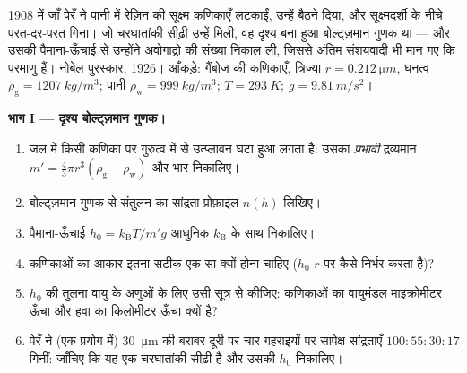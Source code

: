 \begin{problem}\label{pb:b3:canonical-ensemble:1}
1908 में जाँ पेरँ ने पानी में रेज़िन की सूक्ष्म कणिकाएँ लटकाईं,
उन्हें बैठने दिया, और सूक्ष्मदर्शी के नीचे परत-दर-परत गिना। जो
चरघातांकी सीढ़ी उन्हें मिली, वह दृश्य बना हुआ बोल्ट्ज़मान गुणक था ---
और उसकी पैमाना-ऊँचाई से उन्होंने अवोगाद्रो की संख्या निकाल ली, जिससे
अंतिम संशयवादी भी मान गए कि परमाणु हैं। नोबेल पुरस्कार, 1926।
आँकड़े: गैंबोज की कणिकाएँ, त्रिज्या $r =
\qty{0.212}{\micro m}$, घनत्व $\rho_{\text{g}} =
\qty{1207}{kg/m^3}$; पानी $\rho_{\text{w}} = \qty{999}{kg/m^3}$;
$T = \qty{293}{K}$; $g = \qty{9.81}{m/s^2}$।

\medskip\noindent\textbf{भाग I --- दृश्य बोल्ट्ज़मान गुणक।}
\begin{enumerate}
  \item जल में किसी कणिका पर गुरुत्व में से उत्प्लावन घटा हुआ लगता
        है: उसका \emph{प्रभावी} द्रव्यमान $m' = \tfrac43\pi r^3(\rho_{\text{g}}
        - \rho_{\text{w}})$ और भार निकालिए।
  \item बोल्ट्ज़मान गुणक से संतुलन का सांद्रता-प्रोफ़ाइल $n(h)$
        लिखिए।
  \item पैमाना-ऊँचाई $h_0 = k_{\text{B}}T/m'g$ आधुनिक
        $k_{\text{B}}$ के साथ निकालिए।
  \item कणिकाओं का आकार इतना सटीक एक-सा क्यों होना चाहिए ($h_0$
        $r$ पर कैसे निर्भर करता है)?
  \item $h_0$ की तुलना वायु के अणुओं के लिए उसी सूत्र से कीजिए:
        कणिकाओं का वायुमंडल माइक्रोमीटर ऊँचा और हवा का किलोमीटर
        ऊँचा क्यों है?
  \item पेरँ ने (एक प्रयोग में) \qty{30}{\micro m} की बराबर दूरी पर
        चार गहराइयों पर सापेक्ष सांद्रताएँ
        $100 : 55 : 30 : 17$ गिनीं: जाँचिए कि यह एक चरघातांकी
        सीढ़ी है और उसकी $h_0$ निकालिए।
\end{enumerate}


\end{problem}
